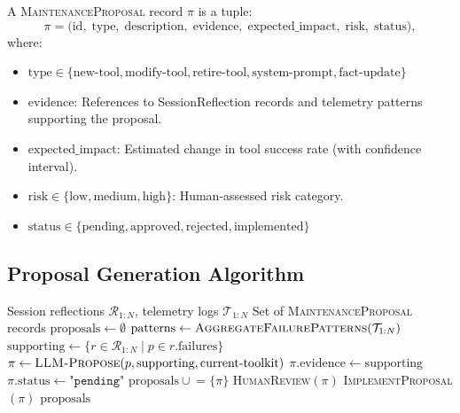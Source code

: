 \begin{definition}[MaintenanceProposal]
\label{def:maintenance_proposal}
A \textsc{MaintenanceProposal} record $\pi$ is a tuple:
\begin{equation}
\pi = \bigl( \text{id},\; \text{type},\; \text{description},\; \text{evidence},\;
             \text{expected\_impact},\; \text{risk},\; \text{status} \bigr),
\end{equation}
where:
\begin{itemize}[leftmargin=1.5em, nosep]
    \item $\text{type} \in \{\text{new-tool}, \text{modify-tool}, \text{retire-tool}, \text{system-prompt}, \text{fact-update}\}$
    \item $\text{evidence}$: References to SessionReflection records and telemetry patterns supporting the proposal.
    \item $\text{expected\_impact}$: Estimated change in tool success rate (with confidence interval).
    \item $\text{risk} \in \{\text{low}, \text{medium}, \text{high}\}$: Human-assessed risk category.
    \item $\text{status} \in \{\text{pending}, \text{approved}, \text{rejected}, \text{implemented}\}$
\end{itemize}
\end{definition}

\subsection{Proposal Generation Algorithm}

\begin{algorithm}[H]
\caption{MAINTENANCE-PASS$(\mathcal{R}_{1:N}, \mathcal{T}_{1:N})$}
\label{alg:maintenance}
\begin{algorithmic}[1]
\Require Session reflections $\mathcal{R}_{1:N}$, telemetry logs $\mathcal{T}_{1:N}$
\Ensure Set of \textsc{MaintenanceProposal} records
\State $\text{proposals} \gets \emptyset$
\State $\text{patterns} \gets \textsc{AggregateFailurePatterns}(\mathcal{T}_{1:N})$
        \State $\text{supporting} \gets \{r \in \mathcal{R}_{1:N} \mid p \in r.\text{failures}\}$
        \State $\pi \gets \textsc{LLM-Propose}(p, \text{supporting}, \text{current-toolkit})$
        \State $\pi.\text{evidence} \gets \text{supporting}$
        \State $\pi.\text{status} \gets \texttt{"pending"}$
        \State $\text{proposals} \mathrel{\cup}= \{\pi\}$
    \EndIf
\EndFor
{}
    \State \textsc{HumanReview}$(\pi)$ 
        \State \textsc{ImplementProposal}$(\pi)$
    \EndIf
\EndFor
\State \Return $\text{proposals}$
\end{algorithmic}
\end{algorithm}


